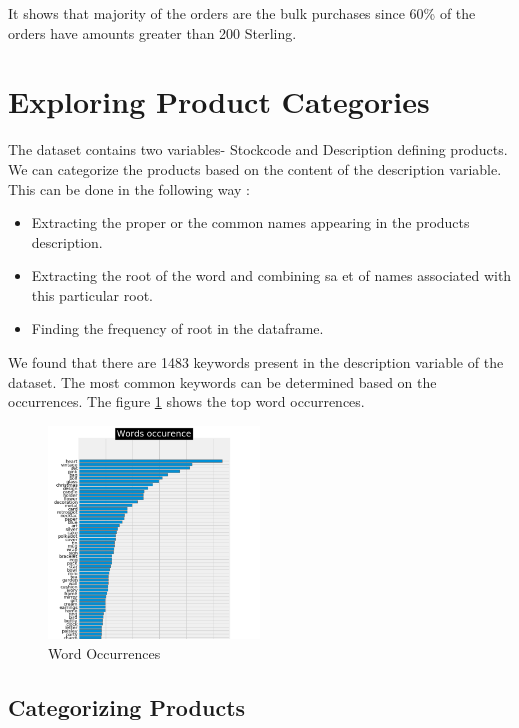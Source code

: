 It shows that majority of the orders are the bulk purchases since 60\% of the orders have amounts greater than 200 Sterling.

\section{Exploring Product Categories}

The dataset contains two variables- Stockcode and Description defining products. We can categorize the products based on the content of the description variable. This can be done in the following way :\\

\begin{itemize}
  \item Extracting the proper or the common names appearing in the products description.
  \item Extracting the root of the word and combining sa et of names associated with this particular root.
  \item Finding the frequency of root in the dataframe.
 \end{itemize}
 
 We found that there are 1483 keywords present in the description variable of the dataset. The most common keywords can be determined based on the occurrences. The figure \ref{3.1} shows the top word occurrences.
 
 \begin{figure}[H]
\caption{Word Occurrences}
\label{3.1}
\centering
\includegraphics[width=0.5\textwidth]{images/3_1.PNG}
\end{figure}

\subsection{Categorizing Products}

